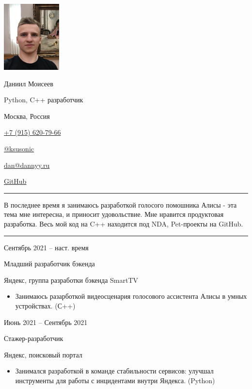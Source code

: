 \documentclass[a4paper,10pt]{article}
\newlength{\cvcolumngapwidth}
\newlength{\cvleftcolumnwidth}
\newlength{\cvrightcolumnwidth}
\newcommand{\cvnamestyle}[1]{{\Large\cvnamefont\textcolor{cvnamecolor}{#1}}}
\newcommand{\cvsectionstyle}[1]{{\normalsize\cvsectionfont\textcolor{cvsectioncolor}{#1}}}
\newcommand{\cvtitlestyle}[1]{{\large\cvtitlefont\textcolor{cvtitlecolor}{#1}}}
\newcommand{\cvdurationstyle}[1]{{\small\cvdurationfont\textcolor{cvdurationcolor}{#1}}}
\newlength{\cvafteritemskipamount}
\newlength{\cvaftersectionskipamount}
\newlength{\cvafternameskipamount}
\newlength{\cvafterpersonalinfolineskipamount}
\newlength{\cvaftertitleskipamount}
\newlength{\cvparskip}
\newcommand{\cvpersonalinfo}[2]{
    \begin{minipage}[t]{\cvleftcolumnwidth}
        \vspace{0mm} %
        \raggedleft #1
    \end{minipage}%
    \hspace{\cvcolumngapwidth}%
    \begin{minipage}[t]{\cvrightcolumnwidth}
        \vspace{0mm} %
        #2
    \end{minipage}

    \vspace{\cvafteritemskipamount}
}
\newcommand{\cvname}[1]{
    \cvnamestyle{#1}

    \vspace{\cvafternameskipamount}
}
\newcommand{\cvpersonalinfolinewithicon}[3]{
    \raisebox{.5\fontcharht\font`E-.5\height}{\texttt{[image: \#2]}}
    #3

    \vspace{\cvafterpersonalinfolineskipamount}
}
\newcommand{\cvsection}[1]{
    \begin{minipage}[t]{\cvleftcolumnwidth}
        \raggedleft\cvsectionstyle{#1}
    \end{minipage}%
    \hspace{\cvcolumngapwidth}%
    \begin{minipage}[t]{\cvrightcolumnwidth}
        \textcolor{cvrulecolor}{\rule{\cvrightcolumnwidth}{0.3mm}}
    \end{minipage}

    \vspace{\cvaftersectionskipamount}
}
\newcommand{\cvitem}[2]{
    \begin{minipage}[t]{\cvleftcolumnwidth}
        \raggedleft #1
    \end{minipage}%
    \hspace{\cvcolumngapwidth}%
    \begin{minipage}[t]{\cvrightcolumnwidth}
        \setlength{\parskip}{\cvparskip} #2
    \end{minipage}

    \vspace{\cvafteritemskipamount}
}
\newcommand{\cvtitle}[1]{
    \cvtitlestyle{#1}

    \vspace{\cvaftertitleskipamount}
    \vspace{-\cvparskip}
}
\begin{document}

\cvpersonalinfo{
    \includegraphics[height=36mm]{dan.jpg}
}{
    \cvname{Даниил Моисеев}
    \cvdurationstyle {Python, C++ разработчик}

    \cvpersonalinfolinewithicon{height=4mm}{img/072-location.pdf}{Москва, Россия}

    \cvpersonalinfolinewithicon{height=4mm}{img/067-phone.pdf}{
        \href{tel:+79156207966}{+7 (915) 620-79-66}
    }

    \cvpersonalinfolinewithicon{height=4mm}{img/telegram.png}{
        \href{https://t.me/ksusonic}{@ksusonic}
    }

    \cvpersonalinfolinewithicon{height=4mm}{img/070-envelop.pdf}{
        \href{mailto:dan@dannyy.ru}{dan@dannyy.ru}
    }

    \cvpersonalinfolinewithicon{height=4mm}{img/github-square-512.png}{
        \href{https://github.com/ksusonic}{GitHub}
    }
}


\cvsection{О себе}
\cvitem{
    \cvdurationstyle{}
}{
    В последнее время я занимаюсь разработкой голосого помошника Алисы - эта тема мне интересна, и приносит удовольствие.
    Мне нравится продуктовая разработка. Весь мой код на C++ находится под NDA, Pet-проекты на GitHub.
}


\cvsection{Опыт работы}

\cvitem{
    \cvdurationstyle{Сентябрь 2021 -- наст. время}
}{
    \cvtitle{Младший разработчик бэкенда}

    Яндекс, группа разработки бэкенда SmartTV

    \begin{itemize}[leftmargin=*]
        \item Занимаюсь разарботкой видеосценария голосового ассистента Алисы в умных устройствах. (С++)
    \end{itemize}
}

\cvitem{
    \cvdurationstyle{Июнь 2021 -- Сентябрь 2021}
}{
    \cvtitle{Стажер-разработчик}

    Яндекс, поисковый портал

    \begin{itemize}[leftmargin=*]
        \item Занимался разработкой в команде стабильности сервисов: улучшал инструменты для работы с инцидентами внутри Яндекса. (Python)
    \end{itemize}
}
\end{document}
